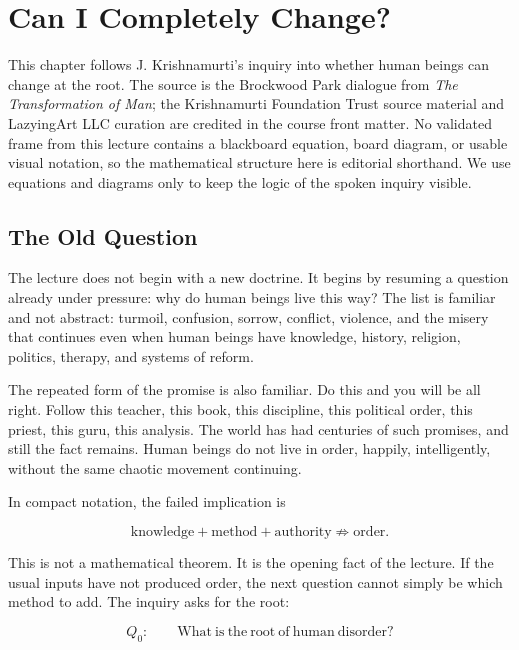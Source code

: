 \chapter{Can I Completely Change?}

This chapter follows J. Krishnamurti's inquiry into whether human beings can change at the root. The source is the Brockwood Park dialogue from \emph{The Transformation of Man}; the Krishnamurti Foundation Trust source material and LazyingArt LLC curation are credited in the course front matter. No validated frame from this lecture contains a blackboard equation, board diagram, or usable visual notation, so the mathematical structure here is editorial shorthand. We use equations and diagrams only to keep the logic of the spoken inquiry visible.

\section{The Old Question}

The lecture does not begin with a new doctrine. It begins by resuming a question already under pressure: why do human beings live this way? The list is familiar and not abstract: turmoil, confusion, sorrow, conflict, violence, and the misery that continues even when human beings have knowledge, history, religion, politics, therapy, and systems of reform.

The repeated form of the promise is also familiar. Do this and you will be all right. Follow this teacher, this book, this discipline, this political order, this priest, this guru, this analysis. The world has had centuries of such promises, and still the fact remains. Human beings do not live in order, happily, intelligently, without the same chaotic movement continuing.

In compact notation, the failed implication is

\begin{equation}
\mathrm{knowledge}+\mathrm{method}+\mathrm{authority}
\not\Rightarrow
\mathrm{order}.
\end{equation}

This is not a mathematical theorem. It is the opening fact of the lecture. If the usual inputs have not produced order, the next question cannot simply be which method to add. The inquiry asks for the root:

\begin{equation}
Q_0:\qquad
\mathrm{What\ is\ the\ root\ of\ human\ disorder?}
\end{equation}

